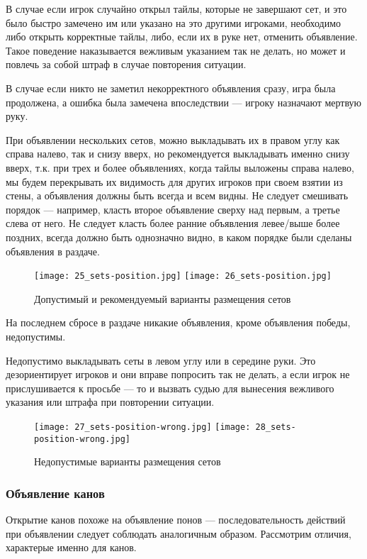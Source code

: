 В случае если игрок случайно открыл тайлы, которые не завершают сет, и это было быстро замечено им или указано на это другими игроками, необходимо либо открыть корректные тайлы, либо, если их в руке нет, отменить объявление. Такое поведение наказывается вежливым указанием так не делать, но может и повлечь за собой штраф в случае повторения ситуации.

В случае если никто не заметил некорректного объявления сразу, игра была продолжена, а ошибка была замечена впоследствии --- игроку назначают мертвую руку.

При объявлении нескольких сетов, можно выкладывать их в правом углу как справа налево, так и снизу вверх, но рекомендуется выкладывать именно снизу вверх, т.к. при трех и более объявлениях, когда тайлы выложены справа налево, мы будем перекрывать их видимость для других игроков при своем взятии из стены, а объявления должны быть всегда и всем видны. Не следует смешивать порядок --- например, класть второе объявление сверху над первым, а третье слева от него. Не следует класть более ранние объявления левее/выше более поздних, всегда должно быть однозначно видно, в каком порядке были сделаны объявления в раздаче.

\begin{figure}[H]
	\centering
	\texttt{[image: 25\_sets-position.jpg]}
	\texttt{[image: 26\_sets-position.jpg]}
	\caption{Допустимый и рекомендуемый варианты размещения сетов}
\end{figure}

На последнем сбросе в раздаче никакие объявления, кроме объявления победы, недопустимы.

Недопустимо выкладывать сеты в левом углу или в середине руки. Это дезориентирует игроков и они вправе попросить так не делать, а если игрок не прислушивается к просьбе --- то и вызвать судью для вынесения вежливого указания или штрафа при повторении ситуации.

\begin{figure}[H]
	\centering
	\texttt{[image: 27\_sets-position-wrong.jpg]}
	\texttt{[image: 28\_sets-position-wrong.jpg]}
	\caption{Недопустимые варианты размещения сетов}
\end{figure}

\subsubsection{Объявление канов}

Открытие канов похоже на объявление понов --- последовательность действий при объявлении следует соблюдать аналогичным образом. Рассмотрим отличия, характерые именно для канов.

